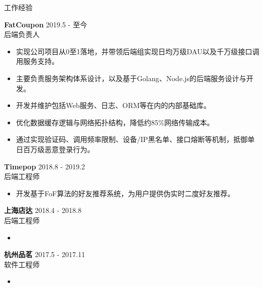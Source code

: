 \documentclass{resume} %
\begin{document}
\begin{rSection}{工作经验}

\textbf{FatCoupon} \hfill 2019.5 - 至今\\
后端负责人 \hfill \textit{}
\begin{itemize}
  \itemsep -3pt {}
  \item 实现公司项目从0至1落地，并带领后端组实现日均万级DAU以及千万级接口调用服务支持。
  \item 主要负责服务架构体系设计，以及基于Golang、Node.js的后端服务设计与开发。
  \item 开发并维护包括Web服务、日志、ORM等在内的内部基础库。
  \item 优化数据缓存逻辑与网络拓扑结构，降低约85\%网络传输成本。
  \item 通过实现验证码、调用频率限制、设备/IP黑名单、接口熔断等机制，抵御单日百万级恶意登录行为。
\end{itemize}

\textbf{Timepop} \hfill 2018.8 - 2019.2\\
后端工程师 \hfill \textit{}
\begin{itemize}
  \itemsep -3pt {}
  \item 开发基于FoF算法的好友推荐系统，为用户提供伪实时二度好友推荐。
\end{itemize}

\textbf{上海店达} \hfill 2018.4 - 2018.8\\
后端工程师 \hfill \textit{}
\begin{itemize}
  \itemsep -3pt {}
  \item 
\end{itemize}

\textbf{杭州品茗} \hfill 2017.5 - 2017.11\\
软件工程师 \hfill \textit{}
\begin{itemize}
  \itemsep -3pt {}
  \item 
\end{itemize}

\end{rSection}
\end{document}
